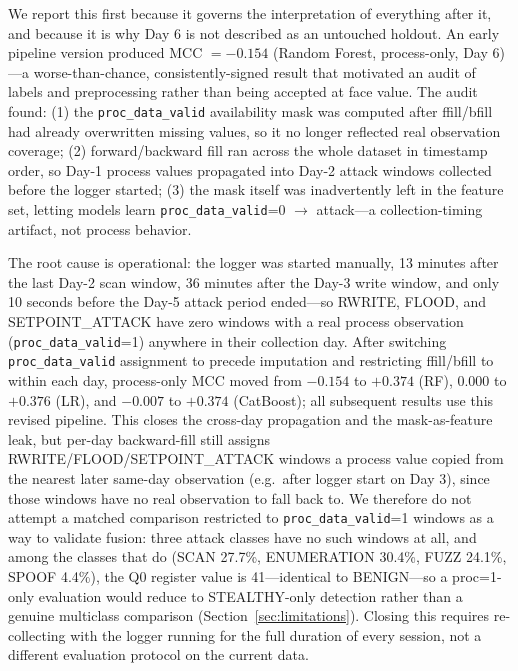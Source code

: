 \documentclass[conference]{IEEEtran}
\begin{document}
We report this first because it governs the interpretation of everything after it, and because it is why
Day 6 is not described as an untouched holdout. An early pipeline version produced MCC $=-0.154$ (Random
Forest, process-only, Day 6)---a worse-than-chance, consistently-signed result that motivated an audit of
labels and preprocessing rather than being accepted at face value. The audit found: (1) the
\texttt{proc\_data\_valid} availability mask was computed after ffill/bfill had already overwritten
missing values, so it no longer reflected real observation coverage; (2) forward/backward fill ran across
the whole dataset in timestamp order, so Day-1 process values propagated into Day-2 attack windows
collected before the logger started; (3) the mask itself was inadvertently left in the feature set,
letting models learn \texttt{proc\_data\_valid}=0 $\rightarrow$ attack---a collection-timing artifact, not
process behavior.

The root cause is operational: the logger was started manually, 13 minutes after the last Day-2 scan
window, 36 minutes after the Day-3 write window, and only 10 seconds before the Day-5 attack period
ended---so RWRITE, FLOOD, and SETPOINT\_ATTACK have zero windows with a real process observation
(\texttt{proc\_data\_valid}=1) anywhere in their collection day. After switching
\texttt{proc\_data\_valid} assignment to precede imputation and restricting ffill/bfill to within each
day, process-only MCC moved from $-0.154$ to $+0.374$ (RF), 0.000 to $+0.376$ (LR), and $-0.007$ to
$+0.374$ (CatBoost); all subsequent results use this revised pipeline. This closes the cross-day
propagation and the mask-as-feature leak, but per-day backward-fill still assigns
RWRITE/FLOOD/SETPOINT\_ATTACK windows a process value copied from the nearest later same-day observation
(e.g.\ after logger start on Day 3), since those windows have no real observation to fall back to. We
therefore do not attempt a matched comparison restricted to \texttt{proc\_data\_valid}=1 windows as a way
to validate fusion: three attack classes have no such windows at all, and among the classes that do (SCAN
27.7\%, ENUMERATION 30.4\%, FUZZ 24.1\%, SPOOF 4.4\%), the Q0 register value is 41---identical to
BENIGN---so a proc=1-only evaluation would reduce to STEALTHY-only detection rather than a genuine
multiclass comparison (Section~\ref{sec:limitations}). Closing this requires re-collecting with the
logger running for the full duration of every session, not a different evaluation protocol on the current
data.
\end{document}
